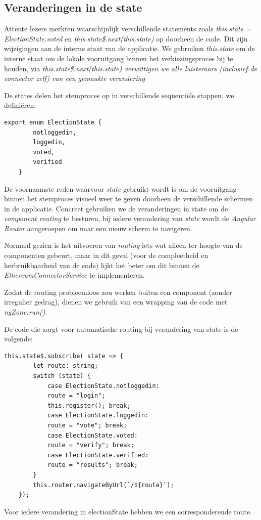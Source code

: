 	\subsection{Veranderingen in de state}
	Attente lezers merkten waarschijnlijk verschillende statements zoals \textit{this.state = ElectionState.voted} en \textit{this.state\$.next(this.state)} op doorheen de code. Dit zijn wijzigingen aan de interne staat van de applicatie. We gebruiken \textit{this.state} om de interne staat om de lokale vooruitgang binnen het verkiezingsproces bij te houden, via \textit{this.state\$.next(this.state) verwittigen we alle luisteraars (inclusief de connector zelf) van een gemaakte verandering}
	
	De states delen het stemproces op in verschillende sequentiële stappen, we definiëren:
	\begin{lstlisting}[numbers=none]
	export enum ElectionState {
		notloggedin,
		loggedin,				
		voted, 						
		verified  					 
	}
	\end{lstlisting}
	De voornaamste reden waarvoor \textit{state} gebruikt wordt is om de vooruitgang binnen het stemproces visueel weer te geven doorheen de verschillende schermen in de applicatie. Concreet gebruiken we de veranderingen in state om de \textit{component routing} te besturen, bij iedere verandering van \textit{state} wordt de \textit{Angular Router} aangeroepen om naar een nieuw scherm te navigeren.
	
	Normaal gezien is het uitvoeren van \textit{routing} iets wat alleen ter hoogte van de componenten gebeurt, maar in dit geval (voor de compleetheid en herbruikbaarheid van de code) lijkt het beter om dit binnen de \textit{EthereumConnectorService} te implementeren. 
	
	Zodat de routing probleemloos zou werken buiten een component (zonder irregulier gedrag), dienen we gebruik van een wrapping van de code met \textit{ngZone.run()}.
	
	De code die zorgt voor automatische routing bij verandering van state is de volgende:
	\begin{lstlisting}[numbers=none]
	this.state$.subscribe( state => {
		let route: string;
		switch (state) {
			case ElectionState.notloggedin:
			route = "login";
			this.register(); break;
			case ElectionState.loggedin:
			route = "vote"; break;
			case ElectionState.voted:
			route = "verify"; break;
			case ElectionState.verified:
			route = "results"; break;
		}
		this.router.navigateByUrl(`/${route}`);
	});
	\end{lstlisting}
	Voor iedere verandering in electionState hebben we een corresponderende route.
	

